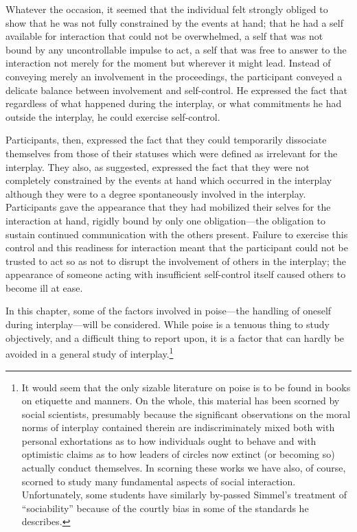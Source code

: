 \documentclass[twoside,symmetric,nobib,justified]{tufte-book}
\begin{document}
Whatever the occasion, it seemed that the individual felt strongly
obliged to show that he was not fully constrained by the events at hand;
that he had a self available for interaction that could not be
overwhelmed, a self that was not bound by any uncontrollable impulse to
act, a self that was free to answer to the interaction not merely for
the moment but wherever it might lead. Instead of conveying merely an
involvement in the proceedings, the participant conveyed a delicate
balance between involvement and self-control. He expressed the fact that
regardless of what happened during the interplay, or what commitments he
had outside the interplay, he could exercise self-control.

Participants, then, expressed the fact that they could temporarily
dissociate themselves from those of their statuses which were defined as
irrelevant for the interplay. They also, as suggested, expressed the
fact that they were not completely constrained by the events at hand
which occurred in the interplay although they were to a degree
spontaneously involved in the interplay. Participants gave the
appearance that they had mobilized their selves for the interaction at
hand, rigidly bound by only one obligation---the obligation to sustain
continued communication with the others present. Failure to exercise
this control and this readiness for interaction meant that the
participant could not be trusted to act so as not to disrupt the
involvement of others in the interplay; the appearance of someone acting
with insufficient self-control itself caused others to become ill at
ease.

In this chapter, some of the factors involved in poise---the handling of
oneself during interplay---will be considered. While poise is a tenuous
thing to study objectively, and a difficult thing to report upon, it is
a factor that can hardly be avoided in a general study of
interplay.\footnote{It would seem that the only sizable literature on
  poise is to be found in books on etiquette and manners. On the whole,
  this material has been scorned by social scientists, presumably
  because the significant observations on the moral norms of interplay
  contained therein are indiscriminately mixed both with personal
  exhortations as to how individuals ought to behave and with optimistic
  claims as to how leaders of circles now extinct (or becoming so)
  actually conduct themselves. In scorning these works we have also, of
  course, scorned to study many fundamental aspects of social
  interaction. Unfortunately, some students have similarly by-passed
  Simmel's treatment of ``sociability'' because of the courtly bias in
  some of the standards he describes.}
\end{document}
